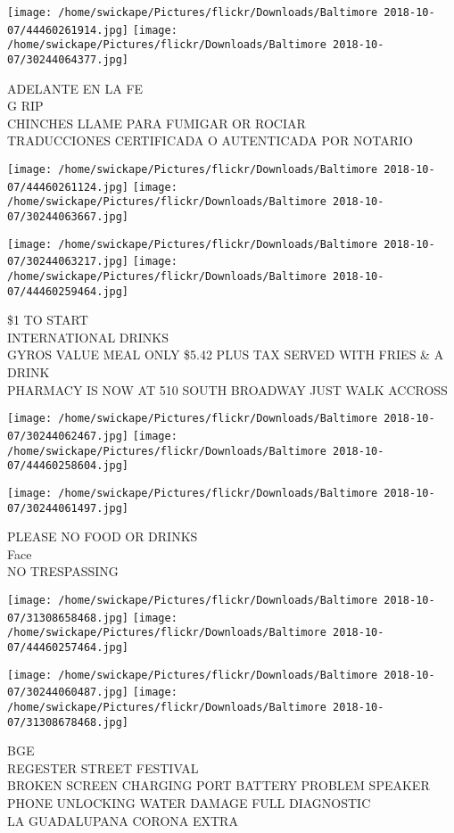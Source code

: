 \documentclass[10pt,letterpaper]{article}
\begin{document}
\texttt{[image: /home/swickape/Pictures/flickr/Downloads/Baltimore 2018-10-07/44460261914.jpg]}
\texttt{[image: /home/swickape/Pictures/flickr/Downloads/Baltimore 2018-10-07/30244064377.jpg]}

ADELANTE EN LA FE\\
G RIP\\
CHINCHES LLAME PARA FUMIGAR OR ROCIAR\\
TRADUCCIONES CERTIFICADA O AUTENTICADA POR NOTARIO
\pagebreak

\texttt{[image: /home/swickape/Pictures/flickr/Downloads/Baltimore 2018-10-07/44460261124.jpg]}
\texttt{[image: /home/swickape/Pictures/flickr/Downloads/Baltimore 2018-10-07/30244063667.jpg]}

\texttt{[image: /home/swickape/Pictures/flickr/Downloads/Baltimore 2018-10-07/30244063217.jpg]}
\texttt{[image: /home/swickape/Pictures/flickr/Downloads/Baltimore 2018-10-07/44460259464.jpg]}

\$1 TO START\\
INTERNATIONAL DRINKS\\
GYROS VALUE MEAL ONLY \$5.42 PLUS TAX SERVED WITH FRIES \& A DRINK\\
PHARMACY IS NOW AT 510 SOUTH BROADWAY JUST WALK ACCROSS
\pagebreak

\texttt{[image: /home/swickape/Pictures/flickr/Downloads/Baltimore 2018-10-07/30244062467.jpg]}
\texttt{[image: /home/swickape/Pictures/flickr/Downloads/Baltimore 2018-10-07/44460258604.jpg]}

\vspace{0.25in}
\texttt{[image: /home/swickape/Pictures/flickr/Downloads/Baltimore 2018-10-07/30244061497.jpg]}

PLEASE NO FOOD OR DRINKS\\
Face\\
NO TRESPASSING
\pagebreak

\texttt{[image: /home/swickape/Pictures/flickr/Downloads/Baltimore 2018-10-07/31308658468.jpg]}
\texttt{[image: /home/swickape/Pictures/flickr/Downloads/Baltimore 2018-10-07/44460257464.jpg]}

\texttt{[image: /home/swickape/Pictures/flickr/Downloads/Baltimore 2018-10-07/30244060487.jpg]}
\texttt{[image: /home/swickape/Pictures/flickr/Downloads/Baltimore 2018-10-07/31308678468.jpg]}

BGE\\
REGESTER STREET FESTIVAL\\
BROKEN SCREEN CHARGING PORT BATTERY PROBLEM SPEAKER PHONE UNLOCKING WATER DAMAGE FULL DIAGNOSTIC\\
LA GUADALUPANA CORONA EXTRA
\pagebreak
\end{document}
